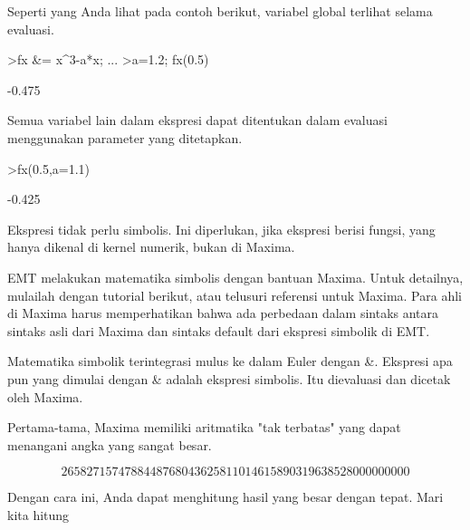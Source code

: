 \documentclass[a4paper,10pt]{article}
\begin{document}
\begin{eulernotebook}
\begin{eulercomment}
Seperti yang Anda lihat pada contoh berikut, variabel global terlihat
selama evaluasi.
\end{eulercomment}
\begin{eulerprompt}
>fx &= x^3-a*x;  ...
>a=1.2; fx(0.5)
\end{eulerprompt}
\begin{euleroutput}
  -0.475
\end{euleroutput}
\begin{eulercomment}
Semua variabel lain dalam ekspresi dapat ditentukan dalam evaluasi
menggunakan parameter yang ditetapkan.
\end{eulercomment}
\begin{eulerprompt}
>fx(0.5,a=1.1)
\end{eulerprompt}
\begin{euleroutput}
  -0.425
\end{euleroutput}
\begin{eulercomment}
Ekspresi tidak perlu simbolis. Ini diperlukan, jika ekspresi berisi
fungsi, yang hanya dikenal di kernel numerik, bukan di Maxima.

\begin{eulercomment}
\begin{eulercomment}
EMT melakukan matematika simbolis dengan bantuan Maxima. Untuk
detailnya, mulailah dengan tutorial berikut, atau telusuri referensi
untuk Maxima. Para ahli di Maxima harus memperhatikan bahwa ada
perbedaan dalam sintaks antara sintaks asli dari Maxima dan sintaks
default dari ekspresi simbolik di EMT.

Matematika simbolik terintegrasi mulus ke dalam Euler dengan \&.
Ekspresi apa pun yang dimulai dengan \& adalah ekspresi simbolis. Itu
dievaluasi dan dicetak oleh Maxima.

Pertama-tama, Maxima memiliki aritmatika "tak terbatas" yang dapat
menangani angka yang sangat besar.
\end{eulercomment}
\begin{eulerformula}
\[
2658271574788448768043625811014615890319638528000000000
\]
\end{eulerformula}
\begin{eulercomment}
Dengan cara ini, Anda dapat menghitung hasil yang besar dengan tepat.
Mari kita hitung


\end{eulercomment}
\end{eulercomment}
\end{eulercomment}
\end{eulernotebook}
\end{document}
